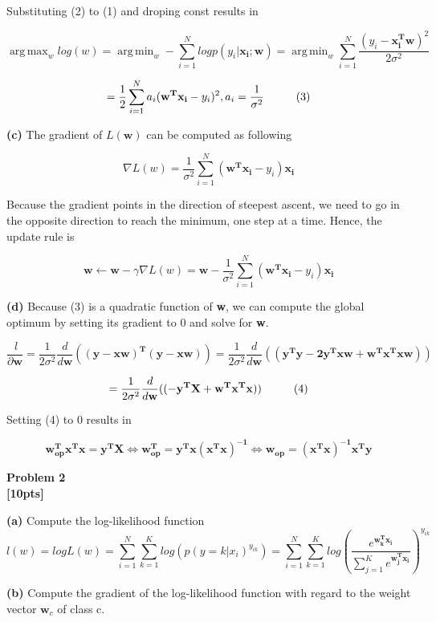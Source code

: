 \documentclass[12pt,article]{article}
\DeclareMathOperator*{\argmax}{arg\,max}
\DeclareMathOperator*{\argmin}{arg\,min}
\newcommand\tab[1][1cm]{\hspace*{#1}}
\newenvironment{problem}[2][Problem]
    { \begin{mdframed}[backgroundcolor=gray!20] \textbf{#1 #2} \\}
    {  \end{mdframed}}
\begin{document}
Substituting (2) to (1) and droping const results in

$$\argmax_{w} log(w) 
= \argmin_{w} -\sum_{i=1}^{N} log p(y_i | \mathbf{x_i; w})
= \argmin_{w} \sum_{i=1}^{N} \frac{(y_i - \mathbf{x_i^T w})^2}{2\sigma^2}
$$

$$
= \frac{1}{2} \sum_{i=1}^{N} a_i (\mathbf{w^T x_i} - y_i)^2, a_i = \frac{1}{\sigma^2} \tab[1cm] (3)
$$ 

\textbf{(c)}
The gradient of $L(\mathbf{w})$ can be computed as following

$$
\nabla L(w) = \frac{1}{\sigma^2} \sum_{i=1}^{N} (\mathbf{w^T x_i} - y_i) \mathbf{x_i}
$$

Because the gradient points in the direction of steepest ascent, we need to 
go in the opposite direction to reach the minimum, one step at a time. Hence, 
the update rule is 

$$
\mathbf{w \leftarrow w} - \gamma \nabla L(w) = \mathbf{w} - \frac{1}{\sigma^2} \sum_{i=1}^{N} (\mathbf{w^T x_i} - y_i) \mathbf{x_i}
$$

\textbf{(d)}
Because (3) is a quadratic function of \textbf{w}, we can compute the global 
optimum by setting its gradient to 0 and solve for \textbf{w}.

$$
\frac{\ l}{\partial \mathbf{w}} 
= \frac{1}{2\sigma^2} \frac{d}{d\mathbf{w}} (\mathbf{(y - xw)^T (y - xw)})
= \frac{1}{2\sigma^2} \frac{d}{d\mathbf{w}} (\mathbf{(y^Ty -2y^Txw + w^Tx^Txw)})
$$

$$
= \frac{1}{2\sigma^2} \frac{d}{d\mathbf{w}} (\mathbf{(-y^TX + w^Tx^Tx)}) \tab[1cm] (4)
$$

Setting (4) to 0 results in

$$
\mathbf{w_{op}^Tx^Tx = y^TX}
\Leftrightarrow
\mathbf{w_{op}^T = y^Tx(x^Tx)^{-1}}
\Leftrightarrow
\mathbf{w_{op} = (x^Tx)^{-1}x^Ty}
$$

\newpage
\begin{problem}{2}
\textbf{[10pts]}
\end{problem}

\textbf{(a)} Compute the log-likelihood function \newline
$$
l(w) = log L(w) = \sum_{i=1}^{N} \sum_{k=1}^{K} log(p(y = k| x_i)^{y_{ik}})
= \sum_{i=1}^{N} \sum_{k=1}^{K} log(\frac{e^{\mathbf{w_k^T x_i}}}{\sum_{j=1}^{K} e^{\mathbf{w_j^T x_i}}}) ^ {y_{ik}}
$$

\textbf{(b)} Compute the gradient of the log-likelihood function with regard to 
the weight vector $\mathbf{w}_c$ of class c.
\end{document}
